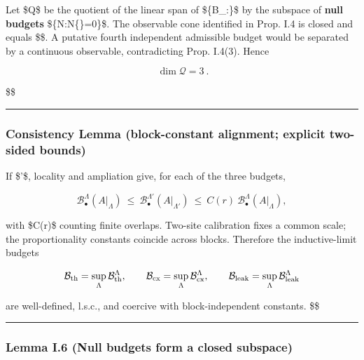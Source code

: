 \documentclass[
]{article}
\numberwithin{equation}{section}
\begin{document}
Let \$\mathcal Q\$ be the quotient of the linear span of
\$\{\mathcal B\_\Lambda:\Lambda\}\$ by the subspace of \textbf{null
budgets}
\$\{\mathcal N:\mathcal N\textbar*\{\}=0\}\$. The
observable cone identified in Prop. I.4 is closed and equals
\$\$. A
putative fourth independent admissible budget would be separated by a
continuous observable, contradicting Prop. I.4(3). Hence

\[
\boxed{\ \dim \mathcal Q=3\ }.
\]

\$\square\$

\begin{center}\rule{0.5\linewidth}{0.5pt}\end{center}

\hypertarget{consistency-lemma-block-constant-alignment-explicit-two-sided-bounds}{%
\subsubsection{Consistency Lemma (block-constant alignment; explicit
two-sided
bounds)}\label{consistency-lemma-block-constant-alignment-explicit-two-sided-bounds}}

If \$\Lambda\subset\Lambda'\$, locality and ampliation give, for each of
the three budgets,

\[
\mathcal B^\Lambda_{\bullet}(A|_\Lambda)\ \le\ \mathcal B^{\Lambda'}_{\bullet}(A|_{\Lambda'})\ \le\ C(r)\ \mathcal B^\Lambda_{\bullet}(A|_\Lambda),
\]

with \$C(r)\$ counting finite overlaps. Two-site calibration fixes a
common scale; the proportionality constants coincide across blocks.
Therefore the inductive-limit budgets

\[
\mathcal B_{\rm th}=\sup_\Lambda \mathcal B_{\rm th}^\Lambda,\qquad
\mathcal B_{\rm cx}=\sup_\Lambda \mathcal B_{\rm cx}^\Lambda,\qquad
\mathcal B_{\rm leak}=\sup_\Lambda \mathcal B_{\rm leak}^\Lambda
\]

are well-defined, l.s.c., and coercive with block-independent constants.
\$\square\$

\begin{center}\rule{0.5\linewidth}{0.5pt}\end{center}

\hypertarget{lemma-i.6-null-budgets-form-a-closed-subspace}{%
\subsubsection{Lemma I.6 (Null budgets form a closed
subspace)}\label{lemma-i.6-null-budgets-form-a-closed-subspace}}
\end{document}
